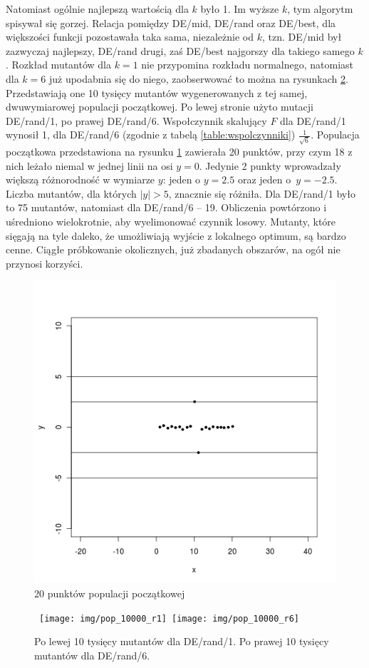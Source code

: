 \documentclass[a4paper,onecolumn,oneside,12pt,wide,floatssmall]{mwrep}
\theoremstyle{definition}
\theoremstyle{plain}%
\theoremstyle{remark}
\begin{document}
Natomiast ogólnie najlepszą wartością dla $k$ było 1. Im wyższe $k$, tym algorytm spisywał się gorzej.
Relacja pomiędzy DE/mid, DE/rand oraz DE/best, dla większości funkcji pozostawała taka sama, 
niezależnie od $k$, tzn. DE/mid był zazwyczaj najlepszy, DE/rand drugi, zaś DE/best najgorszy
dla takiego samego $k$. Rozkład mutantów dla $k = 1$ nie przypomina rozkładu normalnego, 
natomiast dla $k = 6$ już upodabnia się do niego, zaobserwować to można na rysunkach \ref{fig:10k}. 
Przedstawiają one 10 tysięcy mutantów wygenerowanych z tej samej, dwuwymiarowej populacji początkowej.
Po lewej stronie użyto mutacji DE/rand/1, po prawej DE/rand/6. Wspołczynnik skalujący $F$ dla 
DE/rand/1 wynosił 1, dla DE/rand/6 (zgodnie z tabelą \ref{table:wspolczynniki}) $\frac{1}{\sqrt{6}}$.
Populacja początkowa przedstawiona na rysunku \ref{fig:10k_start} zawierała 20 punktów, 
przy czym 18 z nich leżało niemal w jednej linii na osi $y = 0$. 
Jedynie 2 punkty wprowadzały większą różnorodność 
w wymiarze $y$: jeden o $y = 2.5$ oraz jeden o~$y = -2.5$. Liczba mutantów,
dla których $|y| > 5$, znacznie się różniła. Dla DE/rand/1 było to 75 mutantów,
natomiast dla DE/rand/6 -- 19. Obliczenia
powtórzono i uśredniono wielokrotnie, aby wyelimonować czynnik losowy. Mutanty, które sięgają
na tyle daleko, że umożliwiają wyjście z lokalnego optimum, są bardzo cenne. 
Ciągłe próbkowanie okolicznych, już zbadanych obszarów, na ogół nie przynosi korzyści. 

\begin{figure}[H]
\centering
\includegraphics[width=.5\textwidth]{img/pop} 
\caption{20 punktów populacji początkowej} 
\label{fig:10k_start}
\end{figure}

\begin{figure}[H]
\centering
\mbox{
\texttt{[image: img/pop\_10000\_r1]}
\texttt{[image: img/pop\_10000\_r6]}  
}
\caption{Po lewej 10 tysięcy mutantów dla DE/rand/1. Po prawej 10 tysięcy mutantów dla DE/rand/6.} 
\label{fig:10k}
\end{figure}
\end{document}
